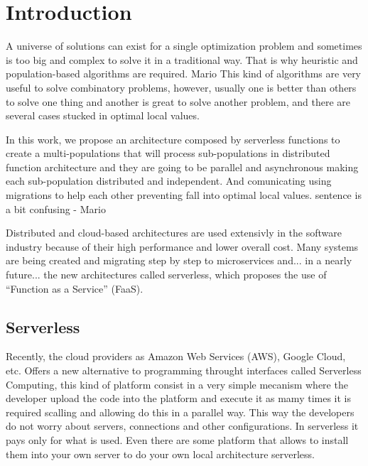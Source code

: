 \documentclass[runningheads]{llncs}
\begin{document}
\section{Introduction}
A universe of solutions can exist for a single optimization problem and sometimes
is too big and complex to solve it in a traditional way. That is why heuristic and
population-based algorithms are required. %
Mario This kind of algorithms are very useful to solve combinatory problems,
however, usually one is better than others to solve one thing and another is
great to solve another problem, and there are several cases stucked in optimal
local values. %

In this work, we propose an architecture composed by serverless functions to
create a multi-populations that will process sub-populations in distributed
function architecture and they are going to be parallel and asynchronous making
each sub-population distributed and independent. And comunicating using
migrations to help each other preventing fall into optimal local values. %
sentence is a bit confusing - Mario

Distributed and cloud-based architectures are used extensivly in the software
industry because of their high performance and lower overall cost.  Many systems
are being created and migrating step by step to microservices and... in a nearly
future... the new architectures called serverless, which proposes the use of
“Function as a Service” (FaaS).

\subsection{Serverless}
Recently, the cloud providers as Amazon Web Services (AWS), Google Cloud, etc.
Offers a new alternative to programming throught interfaces called Serverless
Computing, this kind of platform consist in a very simple mecanism where the
developer upload the code into the platform and execute it as mamy times it is
required scalling and allowing do this in a parallel way. This way the
developers do not worry about servers, connections and other configurations. In
serverless it pays only for what is used. Even there are some platform that
allows to install them into your own server to do your own local architecture
serverless.
\end{document}
